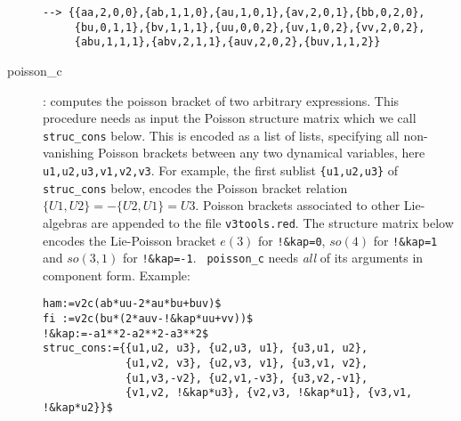 \documentclass[12pt]{article}
\begin{document}
\begin{description}
\begin{verbatim}
--> {{aa,2,0,0},{ab,1,1,0},{au,1,0,1},{av,2,0,1},{bb,0,2,0},
     {bu,0,1,1},{bv,1,1,1},{uu,0,0,2},{uv,1,0,2},{vv,2,0,2},
     {abu,1,1,1},{abv,2,1,1},{auv,2,0,2},{buv,1,1,2}} \end{verbatim}
  \item[poisson\_c] : 
     computes the poisson bracket of two arbitrary expressions. This
     procedure needs as input the Poisson structure matrix which we
     call {\tt struc\_cons} below. This is encoded as a list of lists,
     specifying all non-vanishing Poisson brackets between any two
     dynamical variables, here {\tt u1,u2,u3,v1,v2,v3}. For example,
     the first sublist {\tt \{u1,u2,u3\}} of {\tt struc\_cons} below,
     encodes the Poisson bracket relation $\{U1,U2\}=-\{U2,U1\}=U3$.
     Poisson brackets associated to other Lie-algebras are appended to
     the file {\tt v3tools.red}. The structure matrix below encodes
     the Lie-Poisson bracket $e(3)$ for {\tt !\&kap=0}, $so(4)$ for
     {\tt !\&kap=1} and $so(3,1)$ for {\tt !\&kap=-1}.  {\tt
     poisson\_c} needs {\it all} of its arguments in component form.
     Example: \begin{verbatim}
ham:=v2c(ab*uu-2*au*bu+buv)$
fi :=v2c(bu*(2*auv-!&kap*uu+vv))$
!&kap:=-a1**2-a2**2-a3**2$
struc_cons:={{u1,u2, u3}, {u2,u3, u1}, {u3,u1, u2},
             {u1,v2, v3}, {u2,v3, v1}, {u3,v1, v2},
             {u1,v3,-v2}, {u2,v1,-v3}, {u3,v2,-v1},
             {v1,v2, !&kap*u3}, {v2,v3, !&kap*u1}, {v3,v1, !&kap*u2}}$


\end{verbatim}
\end{description}
\end{document}

